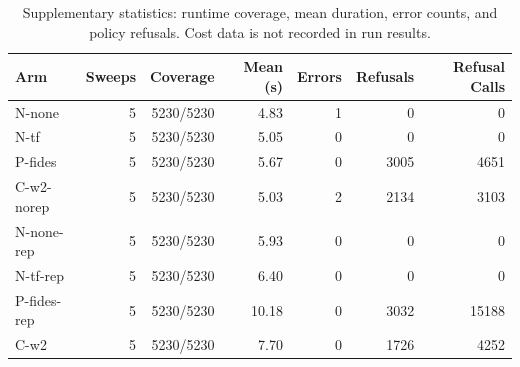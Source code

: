 \begin{table}[t]
\centering
\footnotesize
\begin{tabular}{@{}l r r r r r r@{}}
\toprule
\textbf{Arm} & \textbf{Sweeps} & \textbf{Coverage} & \textbf{Mean (s)} & \textbf{Errors} & \textbf{Refusals} & \textbf{Refusal Calls} \\
\midrule
N-none & 5 & 5230/5230 & 4.83 & 1 & 0 & 0 \\
N-tf & 5 & 5230/5230 & 5.05 & 0 & 0 & 0 \\
P-fides & 5 & 5230/5230 & 5.67 & 0 & 3005 & 4651 \\
C-w2-norep & 5 & 5230/5230 & 5.03 & 2 & 2134 & 3103 \\
N-none-rep & 5 & 5230/5230 & 5.93 & 0 & 0 & 0 \\
N-tf-rep & 5 & 5230/5230 & 6.40 & 0 & 0 & 0 \\
P-fides-rep & 5 & 5230/5230 & 10.18 & 0 & 3032 & 15188 \\
C-w2 & 5 & 5230/5230 & 7.70 & 0 & 1726 & 4252 \\
\bottomrule
\end{tabular}
\caption{Supplementary statistics: runtime coverage, mean duration, error counts, and policy refusals. Cost data is not recorded in run results.}
\label{tab:agentdojo-supp}
\end{table}
